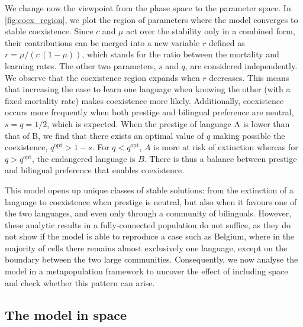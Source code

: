 \documentclass[../thesis.tex]{subfiles}
\begin{document}
We change now the viewpoint from the phase space to the parameter space. In
\cref{fig:coex_region}, we plot the region of parameters where the model converges to
stable coexistence. Since $c$ and $\mu$ act over the stability only in a combined form,
their contributions can be merged into a new variable $r$ defined as $r = \mu/(c \,
(1-\mu))$, which stands for the ratio between the mortality and learning rates. The
other two parameters, $s$ and $q$, are considered independently. We observe that the
coexistence region expands when $r$ decreases. This means that increasing the ease to
learn one language when knowing the other (with a fixed mortality rate) makes
coexistence more likely. Additionally, coexistence occurs more frequently when both
prestige and bilingual preference are neutral, $s = q = 1/2$, which is expected. When
the prestige of language A is lower than that of B, we find that there exists an optimal
value of $q$ making possible the coexistence, $q^\text{opt} > 1-s$. For $q <
q^\text{opt}$, $A$ is more at risk of extinction whereas for $q > q^\text{opt}$, the
endangered language is $B$. There is thus a balance between prestige and bilingual
preference that enables coexistence. 

This model opens up unique classes of stable solutions: from the extinction of a
language to coexistence when prestige is neutral, but also when it favours one of the
two languages, and even only through a community of bilinguals. However, these analytic
results in a fully-connected population do not suffice, as they do not show if the model
is able to reproduce a case such as Belgium, where in the majority of cells there
remains almost exclusively one language, except on the boundary between the two large
communities. Consequently, we now analyse the model in a metapopulation framework to
uncover the effect of including space and check whether this pattern can arise.


\subsection{The model in space}
\end{document}
